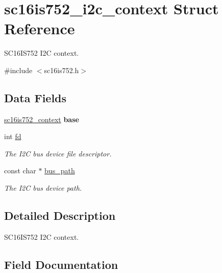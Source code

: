 \hypertarget{structsc16is752__i2c__context}{}\section{sc16is752\+\_\+i2c\+\_\+context Struct Reference}
\label{structsc16is752__i2c__context}


S\+C16\+I\+S752 I2C context.  




{\ttfamily \#include $<$sc16is752.\+h$>$}

\subsection*{Data Fields}
\begin{DoxyCompactItemize}
\item 
\mbox{\label{structsc16is752__i2c__context_a27ece143546f2221d54229d472a7945c}} 
\mbox{\hyperlink{structsc16is752__context}{sc16is752\+\_\+context}} {\bfseries base}
\item 
int \mbox{\hyperlink{structsc16is752__i2c__context_ae8a161c476233aef6f31295df2786d0c}{fd}}
\begin{DoxyCompactList}\small\item\em The I2C bus device file descriptor. \end{DoxyCompactList}\item 
const char $\ast$ \mbox{\hyperlink{structsc16is752__i2c__context_abe185084807bf900901630aebb81488a}{bus\+\_\+path}}
\begin{DoxyCompactList}\small\item\em The I2C bus device path. \end{DoxyCompactList}\end{DoxyCompactItemize}


\subsection{Detailed Description}
S\+C16\+I\+S752 I2C context. 

\subsection{Field Documentation}
\mbox{\label{structsc16is752__i2c__context_abe185084807bf900901630aebb81488a}} 
